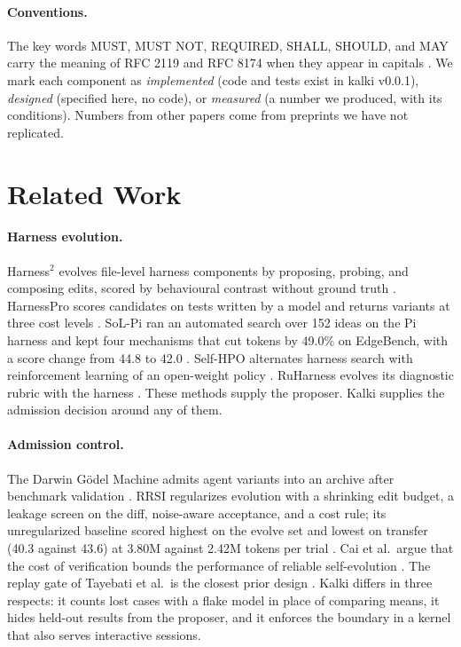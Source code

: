 \documentclass[11pt,a4paper]{article}
\begin{document}
\paragraph{Conventions.} The key words MUST, MUST NOT, REQUIRED, SHALL, SHOULD, and MAY carry the meaning of RFC 2119 and RFC 8174 when they appear in capitals \citep{rfc2119,rfc8174}. We mark each component as \emph{implemented} (code and tests exist in kalki v0.0.1), \emph{designed} (specified here, no code), or \emph{measured} (a number we produced, with its conditions). Numbers from other papers come from preprints we have not replicated.

\section{Related Work}
\label{sec:related}

\paragraph{Harness evolution.} Harness$^2$ evolves file-level harness components by proposing, probing, and composing edits, scored by behavioural contrast without ground truth \citep{xu2026harness2}. HarnessPro scores candidates on tests written by a model and returns variants at three cost levels \citep{pan2026harnesspro}. SoL-Pi ran an automated search over 152 ideas on the Pi harness and kept four mechanisms that cut tokens by 49.0\% on EdgeBench, with a score change from 44.8 to 42.0 \citep{liu2026solpi}. Self-HPO alternates harness search with reinforcement learning of an open-weight policy \citep{wei2026hpo}. RuHarness evolves its diagnostic rubric with the harness \citep{chen2026ruharness}. These methods supply the proposer. Kalki supplies the admission decision around any of them.

\paragraph{Admission control.} The Darwin G\"odel Machine admits agent variants into an archive after benchmark validation \citep{zhang2025dgm}. RRSI regularizes evolution with a shrinking edit budget, a leakage screen on the diff, noise-aware acceptance, and a cost rule; its unregularized baseline scored highest on the evolve set and lowest on transfer (40.3 against 43.6) at 3.80M against 2.42M tokens per trial \citep{xia2026rrsi}. Cai et al.\ argue that the cost of verification bounds the performance of reliable self-evolution \citep{cai2026theory}. The replay gate of Tayebati et al.\ is the closest prior design \citep{tayebati2026selfhealing}. Kalki differs in three respects: it counts lost cases with a flake model in place of comparing means, it hides held-out results from the proposer, and it enforces the boundary in a kernel that also serves interactive sessions.
\end{document}
